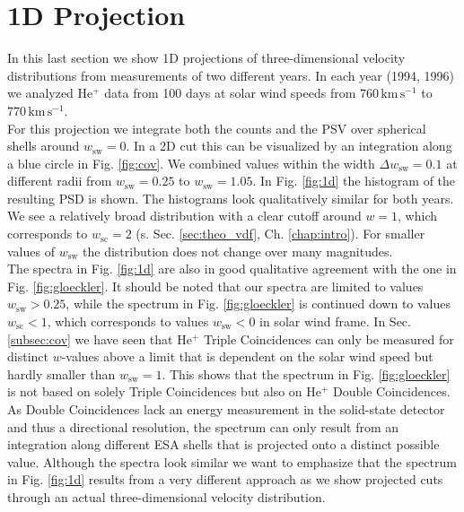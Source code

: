 \section{1D Projection}
In this last section we show 1D projections of three-dimensional velocity distributions from measurements of two different years. In each year (1994, 1996) we analyzed $\mathrm{He^{+}}$ data from 100 days at solar wind speeds from $760 \, \mathrm{km\,s^{-1}}$ to $770 \, \mathrm{km\,s^{-1}}$.\\
For this projection we integrate both the counts and the PSV over spherical shells around $w_\mathrm{sw}=0$. In a 2D cut this can be visualized by an integration along a blue circle in Fig. \ref{fig:cov}. We combined values within the width $\Delta w_\mathrm{sw} = 0.1$ at different radii from $w_\mathrm{sw} = 0.25$ to $w_\mathrm{sw} = 1.05$. In Fig. \ref{fig:1d} the histogram of the resulting PSD is shown. The histograms look qualitatively similar for both years. 
We see a relatively broad distribution with a clear cutoff around $w = 1$, which corresponds to $w_\mathrm{sc} = 2$ (s. Sec. \ref{sec:theo_vdf}, Ch. \ref{chap:intro}). For smaller values of $w_\mathrm{sw}$ the distribution does not change over many magnitudes. 
\\
The spectra in Fig. \ref{fig:1d} are also in good qualitative agreement with the one in Fig. \ref{fig:gloeckler}. It should be noted that our spectra are limited to values $w_\mathrm{sw} > 0.25$, while the spectrum in Fig. \ref{fig:gloeckler} is continued down to values $w_\mathrm{sc} < 1$, which corresponds to values $w_\mathrm{sw} < 0$ in solar wind frame. In Sec. \ref{subsec:cov} we have seen that $\mathrm{He^{+}}$ Triple Coincidences can only be measured for distinct $w$-values above a limit that is dependent on the solar wind speed but hardly smaller than $w_\mathrm{sw} = 1$. This shows that the spectrum in Fig. \ref{fig:gloeckler} is not based on solely Triple Coincidences but also on $\mathrm{He^{+}}$ Double Coincidences. As Double Coincidences lack an energy measurement in the solid-state detector and thus a directional resolution, the spectrum can only result from an integration along different ESA shells that is projected onto a distinct possible value.
Although the spectra look similar we want to emphasize that the spectrum in Fig. \ref{fig:1d} results from a very different approach as we show projected cuts through an actual three-dimensional velocity distribution.
